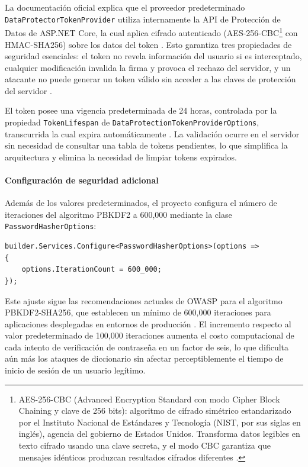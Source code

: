 La documentación oficial explica que el proveedor predeterminado \texttt{DataProtector\-TokenProvider} utiliza internamente la API de Protección de Datos de ASP.NET Core, la cual aplica cifrado autenticado (AES-256-CBC\footnote{AES-256-CBC (Advanced Encryption Standard con modo Cipher Block Chaining y clave de 256 bits): algoritmo de cifrado simétrico estandarizado por el Instituto Nacional de Estándares y Tecnología (NIST, por sus siglas en inglés), agencia del gobierno de Estados Unidos. Transforma datos legibles en texto cifrado usando una clave secreta, y el modo CBC garantiza que mensajes idénticos produzcan resultados cifrados diferentes \cite{nist_aes}.} con HMAC-SHA256) sobre los datos del token \cite{microsoft_token_providers}. 
Esto garantiza tres propiedades de seguridad esenciales: el token no revela información del usuario si es interceptado, cualquier modificación invalida la firma y provoca el rechazo del servidor, y un atacante no puede generar un token válido sin acceder a las claves de protección del servidor \cite{microsoft_data_protection}.

El token posee una vigencia predeterminada de 24 horas, controlada por la propiedad \texttt{TokenLifespan} de \texttt{DataProtectionTokenProviderOptions}, transcurrida la cual expira automáticamente \cite{microsoft_identity_config}. 
La validación ocurre en el servidor sin necesidad de consultar una tabla de tokens pendientes, lo que simplifica la arquitectura y elimina la necesidad de limpiar tokens expirados. 

\paragraph{Configuración de seguridad adicional}

Además de los valores predeterminados, el proyecto configura el número de iteraciones del algoritmo PBKDF2 a 600,000 mediante la clase \texttt{PasswordHasherOptions}:

\begin{lstlisting}[language={[Sharp]C}, caption={Configuración de iteraciones de hashing en Program.cs}, label={lst:passwordoptions}]
builder.Services.Configure<PasswordHasherOptions>(options =>
{
    options.IterationCount = 600_000;
});
\end{lstlisting}

Este ajuste sigue las recomendaciones actuales de OWASP para el algoritmo PBKDF2-SHA256, que establecen un mínimo de 600,000 iteraciones para aplicaciones desplegadas en entornos de producción \cite{owasp_password_storage}. El incremento respecto al valor predeterminado de 100,000 iteraciones aumenta el costo computacional de cada intento de verificación de contraseña en un factor de seis, lo que dificulta aún más los ataques de diccionario sin afectar perceptiblemente el tiempo de inicio de sesión de un usuario legítimo.

